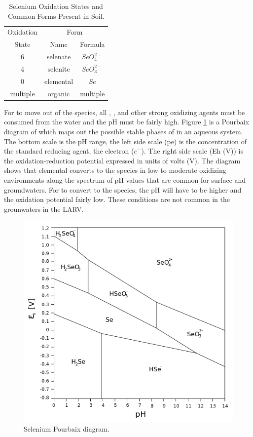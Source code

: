 \begin{table}[!htbp]
	\centering	
	\caption[Selenium Oxidation States and Common Forms Present in Soil.]{Selenium Oxidation States and Common Forms Present in Soil.}
	\label{tab:SeOxidationStates}
	\begin{tabular}{ccc}
		\toprule
		Oxidation & \multicolumn{2}{c}{Form}\\\cmidrule{2-3}
		State & Name & Formula \\
		\midrule
		6 & selenate & $SeO_4^{2-}$\\
		4 & selenite & $SeO_3^{2-}$\\
		0 & elemental & $Se$\\
		multiple & organic & multiple\\
		\bottomrule
	\end{tabular}
\end{table}

For \Se to move out of the \selenate species, all \dox, \nitrate, and other strong oxidizing agents must be consumed from the water and the pH must be fairly high.  Figure \ref{fig:Pourbaix} is a Pourbaix diagram of \Se which maps out the possible stable phases of \Se in an aqueous system.  The bottom scale is the pH range, the left side scale (pe) is the concentration of the standard reducing agent, the electron ($e^-$).  The right side scale (Eh (V)) is the oxidation-reduction potential expressed in units of volts (V).  The diagram shows that elemental \Se converts to the \selenate species in low to moderate oxidizing environments along the spectrum of pH values that are common for surface and groundwaters.  For \selenate to convert to the \selenite species, the pH will have to be higher and the oxidation potential fairly low.  These conditions are not common in the grounwaters in the LARV.

\begin{figure}[!htbp]
	\centering
	\includegraphics[scale=0.75]{"Figures/SeleniumPourbaix"}
	\caption[Selenium Pourbaix diagram.]{Selenium Pourbaix diagram.}
	\label{fig:Pourbaix}
\end{figure}

